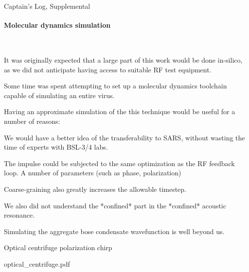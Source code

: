 \documentclass[paper.tex]{subfiles}
\begin{document}
\clearpage
{\Huge Captain's Log, Supplemental}\\

\paragraph{Molecular dynamics simulation}
\

It was originally expected that a large part of this work would be done in-silico, as we did not anticipate having access to suitable RF test equipment. 

Some time was spent attempting to set up a molecular dynamics toolchain capable of simulating an entire virus. 

Having an approximate simulation of the this technique would be useful for a number of reasons: 

We would have a better idea of the transferability to SARS, without wasting the time of experts with BSL-3/4 labs.

The impulse could be subjected to the same optimization as the RF feedback loop. A number of parameters (such as phase, polarization)



Coarse-graining also greatly increases the allowable timestep.

We also did not understand the *confined* part in the *confined* acoustic resonance.

Simulating the aggregate bose condensate wavefunction is well beyond us.







\clearpage
{\Large Optical centrifuge polarization chirp}\\
\begin{multicols}{1}



{optical_centrifuge.pdf}


\end{multicols}
\end{document}
